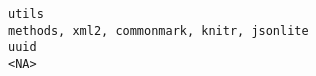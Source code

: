\documentclass[
  letterpaper,
  DIV=11,
  numbers=noendperiod]{scrreprt}
\begin{document}
\begin{verbatim}
utils                                                                                                                                                                                                                                                                                                                                                                                                                                                                                                                                                                                                                                                                                                                                                                                                                                                                                                                                                                                                                                                                                                                                                                                                                                                              methods, xml2, commonmark, knitr, jsonlite
uuid                                                                                                                                                                                                                                                                                                                                                                                                                                                                                                                                                                                                                                                                                                                                                                                                                                                                                                                                                                                                                                                                                                                                                                                                                                                                                                     <NA>

\end{verbatim}
\end{document}
